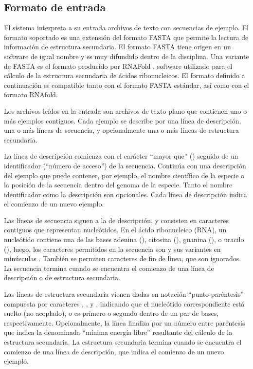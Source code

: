 %
%
\subsection{Formato de entrada}
%
El sistema interpreta a su entrada archivos de texto con secuencias de
ejemplo. El formato soportado es una extensión del formato FASTA que
permite la lectura de información de estructura secundaria.  El
formato FASTA tiene origen en un software de igual nombre
\citeauthor{fasta} \cite{fasta} y es muy difundido dentro de la
disciplina. Una variante de FASTA es el formato producido por RNAFold
\cite{vienna}, software utilizado para el cálculo de la estructura
secundaria de ácidos ribonucleicos. El formato definido a continuación
es compatible tanto con el formato FASTA estándar, así como con el
formato RNAfold.

Los archivos leídos en la entrada son archivos de texto plano que
contienen uno o más ejemplos contiguos. Cada ejemplo se describe por
una línea de descripción, una o más líneas de secuencia, y
opcionalmente una o más líneas de estructura secundaria.

La línea de descripción comienza con el carácter ``mayor que''
(\mono{>}) seguido de un identificador (``número de acceso'') de la
secuencia. Continúa con una descripción del ejemplo que puede
contener, por ejemplo, el nombre científico de la especie o la
posición de la secuencia dentro del genoma de la especie. Tanto el
nombre identificador como la descripción son opcionales.
Cada línea de descripción indica el comienzo de un nuevo ejemplo.

Las líneas de secuencia siguen a la de descripción, y consisten en
caracteres contiguos que representan nucleótidos. En el ácido
ribonucleico (RNA), un nucleótido contiene una de las bases adenina
(), citosina (), guanina (), o uracilo
(), luego, los caracteres permitidos en la secuencia son
 y sus variantes en minúsculas . También se
permiten caracteres de fin de línea, que son ignorados. La secuencia
termina cuando se encuentra el comienzo de una línea de descripción o
de estructura secundaria.

Las líneas de estructura secundaria vienen dadas en notación
``punto-paréntesis'' compuesta por caracteres , \mono{(}, y
\mono{)}, indicando que el nucleótido correspondiente está suelto (no
acoplado), o es primero o segundo dentro de un par de bases,
respectivamente.  Opcionalmente, la línea finaliza por un número entre
paréntesis que indica la denominada ``mínima energía libre''
resultante del cálculo de la estructura secundaria. La estructura
secundaria termina cuando se encuentra el comienzo de una línea de
descripción, que indica el comienzo de un nuevo ejemplo.

